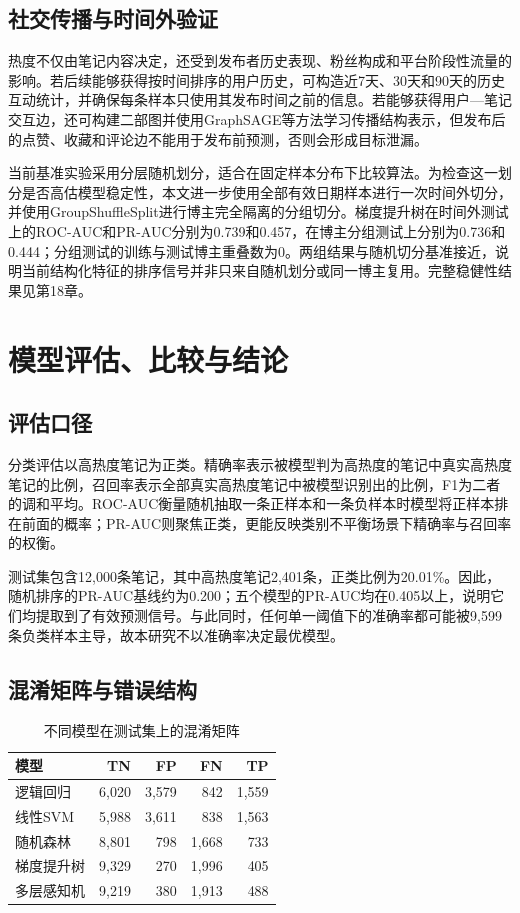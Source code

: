 \section{社交传播与时间外验证}
热度不仅由笔记内容决定，还受到发布者历史表现、粉丝构成和平台阶段性流量的影响。若后续能够获得按时间排序的用户历史，可构造近7天、30天和90天的历史互动统计，并确保每条样本只使用其发布时间之前的信息。若能够获得用户---笔记交互边，还可构建二部图并使用GraphSAGE等方法学习传播结构表示，但发布后的点赞、收藏和评论边不能用于发布前预测，否则会形成目标泄漏。

当前基准实验采用分层随机划分，适合在固定样本分布下比较算法。为检查这一划分是否高估模型稳定性，本文进一步使用全部有效日期样本进行一次时间外切分，并使用GroupShuffleSplit进行博主完全隔离的分组切分。梯度提升树在时间外测试上的ROC-AUC和PR-AUC分别为0.739和0.457，在博主分组测试上分别为0.736和0.444；分组测试的训练与测试博主重叠数为0。两组结果与随机切分基准接近，说明当前结构化特征的排序信号并非只来自随机划分或同一博主复用。完整稳健性结果见第18章。

\chapter{模型评估、比较与结论}

\section{评估口径}
分类评估以高热度笔记为正类。精确率表示被模型判为高热度的笔记中真实高热度笔记的比例，召回率表示全部真实高热度笔记中被模型识别出的比例，F1为二者的调和平均。ROC-AUC衡量随机抽取一条正样本和一条负样本时模型将正样本排在前面的概率；PR-AUC则聚焦正类，更能反映类别不平衡场景下精确率与召回率的权衡。

测试集包含12,000条笔记，其中高热度笔记2,401条，正类比例为20.01\%。因此，随机排序的PR-AUC基线约为0.200；五个模型的PR-AUC均在0.405以上，说明它们均提取到了有效预测信号。与此同时，任何单一阈值下的准确率都可能被9,599条负类样本主导，故本研究不以准确率决定最优模型。

\section{混淆矩阵与错误结构}
\begin{table}[htbp]
\centering
\caption{不同模型在测试集上的混淆矩阵}
\label{tab:chapter12-confusion}
\begin{tabular}{lrrrr}
\toprule
模型 & TN & FP & FN & TP \\
\midrule
逻辑回归 & 6,020 & 3,579 & 842 & 1,559 \\
线性SVM & 5,988 & 3,611 & 838 & 1,563 \\
随机森林 & 8,801 & 798 & 1,668 & 733 \\
梯度提升树 & 9,329 & 270 & 1,996 & 405 \\
多层感知机 & 9,219 & 380 & 1,913 & 488 \\
\bottomrule
\end{tabular}
\end{table}


